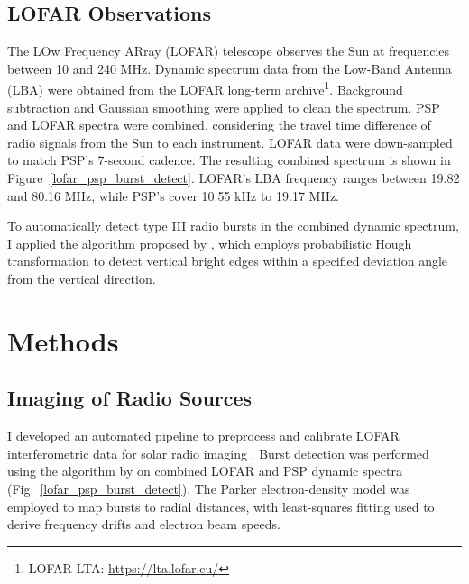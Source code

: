 \subsection{LOFAR Observations}
The LOw Frequency ARray (LOFAR) telescope \citep{lofar_2013} observes the Sun at frequencies between 10 and 240 MHz. Dynamic spectrum data from the Low-Band Antenna (LBA) were obtained from the LOFAR long-term archive\footnote{LOFAR LTA: \url{https://lta.lofar.eu/}}. Background subtraction and Gaussian smoothing were applied to clean the spectrum. PSP and LOFAR spectra were combined, considering the travel time difference of radio signals from the Sun to each instrument. LOFAR data were down-sampled to match PSP's 7-second cadence. The resulting combined spectrum is shown in Figure~\ref{lofar_psp_burst_detect}. LOFAR's LBA frequency ranges between 19.82 and 80.16 MHz, while PSP's cover 10.55 kHz to 19.17 MHz.

To automatically detect type III radio bursts in the combined dynamic spectrum, I applied the algorithm proposed by \citet{zhang_2018}, which employs probabilistic Hough transformation to detect vertical bright edges within a specified deviation angle from the vertical direction.

\section{Methods}
\label{sec_ch3_methods}
\subsection{Imaging of Radio Sources}
I developed an automated pipeline to preprocess and calibrate LOFAR interferometric data for solar radio imaging \citep{zhang_radio_2022}. Burst detection was performed using the algorithm by \citet{zhang_2018} on combined LOFAR and PSP dynamic spectra (Fig.~\ref{lofar_psp_burst_detect}). The Parker electron-density model \citep{parker_1960} was employed to map bursts to radial distances, with least-squares fitting used to derive frequency drifts and electron beam speeds.

